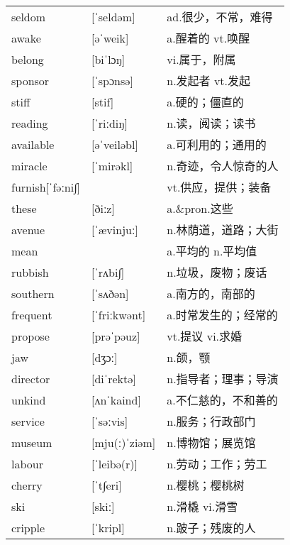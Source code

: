 \documentclass[a4paper]{article}
\begin{document}
\section{}
\begin{tabular}{l l l}

seldom & [ˈseldəm] & ad.很少，不常，难得 \\
awake & [əˈweik] & a.醒着的 vt.唤醒 \\
belong & [biˈlɔŋ] & vi.属于，附属 \\
sponsor & [ˈspɔnsə] & n.发起者 vt.发起 \\
stiff & [stif] & a.硬的；僵直的 \\
reading & [ˈriːdiŋ] & n.读，阅读；读书 \\
available & [əˈveiləbl] & a.可利用的；通用的 \\
miracle & [ˈmirəkl] & n.奇迹，令人惊奇的人 \\
furnish[ˈfəːni∫] &  & vt.供应，提供；装备 \\
these & [ðiːz] & a.\&pron.这些 \\
avenue & [ˈævinjuː] & n.林荫道，道路；大街 \\
mean &  & a.平均的 n.平均值 \\
rubbish & [ˈrʌbi∫] & n.垃圾，废物；废话 \\
southern & [ˈsʌðən] & a.南方的，南部的 \\
frequent & [ˈfriːkwənt] & a.时常发生的；经常的 \\
propose & [prəˈpəuz] & vt.提议 vi.求婚 \\
jaw & [dʒɔː] & n.颌，颚 \\
director & [diˈrektə] & n.指导者；理事；导演 \\
unkind & [ʌnˈkaind] & a.不仁慈的，不和善的 \\
service & [ˈsəːvis] & n.服务；行政部门 \\
museum & [mju(ː)ˈziəm] & n.博物馆；展览馆 \\
labour & [ˈleibə(r)] & n.劳动；工作；劳工 \\
cherry & [ˈt∫eri] & n.樱桃；樱桃树 \\
ski & [skiː] & n.滑橇 vi.滑雪 \\
cripple & [ˈkripl] & n.跛子；残废的人 \\

\end{tabular}
\end{document}
